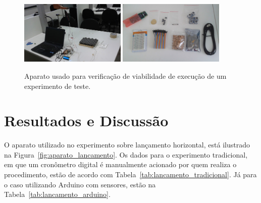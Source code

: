 \documentclass[11pt,a4paper]{article}
\begin{document}
\begin{figure}[!hbt]
\centering
\includegraphics[width=0.45\textwidth]{figs/computador1.jpg}\hspace{5mm}
\includegraphics[width=0.45\textwidth]{figs/materiais1.jpg}
\caption{Aparato usado  para verificação de viabilidade de execução de um experimento de teste.}
\label{fig:aparato_computador}
\end{figure}










\section{Resultados e Discussão}


O aparato utilizado no experimento sobre lançamento horizontal, está ilustrado na Figura~\ref{fig:aparato_lancamento}.
Os dados para o experimento tradicional, em que um cronômetro digital é manualmente acionado por quem realiza o procedimento, estão de acordo com Tabela~\ref{tab:lancamento_tradicional}.
Já para o caso utilizando Arduino com sensores, estão na Tabela~\ref{tab:lancamento_arduino}.
\end{document}
